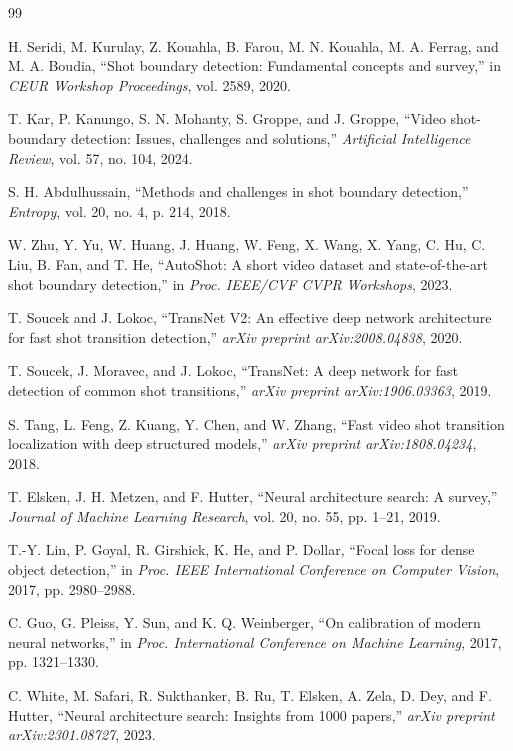 \documentclass[journal]{IEEEtran}
\begin{document}
\begin{thebibliography}{99}

H. Seridi, M. Kurulay, Z. Kouahla, B. Farou, M. N. Kouahla, M. A. Ferrag, and M. A. Boudia, ``Shot boundary detection: Fundamental concepts and survey,'' in \emph{CEUR Workshop Proceedings}, vol. 2589, 2020.

T. Kar, P. Kanungo, S. N. Mohanty, S. Groppe, and J. Groppe, ``Video shot-boundary detection: Issues, challenges and solutions,'' \emph{Artificial Intelligence Review}, vol. 57, no. 104, 2024.

S. H. Abdulhussain, ``Methods and challenges in shot boundary detection,'' \emph{Entropy}, vol. 20, no. 4, p. 214, 2018.

W. Zhu, Y. Yu, W. Huang, J. Huang, W. Feng, X. Wang, X. Yang, C. Hu, C. Liu, B. Fan, and T. He, ``AutoShot: A short video dataset and state-of-the-art shot boundary detection,'' in \emph{Proc. IEEE/CVF CVPR Workshops}, 2023.

T. Soucek and J. Lokoc, ``TransNet V2: An effective deep network architecture for fast shot transition detection,'' \emph{arXiv preprint arXiv:2008.04838}, 2020.

T. Soucek, J. Moravec, and J. Lokoc, ``TransNet: A deep network for fast detection of common shot transitions,'' \emph{arXiv preprint arXiv:1906.03363}, 2019.

S. Tang, L. Feng, Z. Kuang, Y. Chen, and W. Zhang, ``Fast video shot transition localization with deep structured models,'' \emph{arXiv preprint arXiv:1808.04234}, 2018.

T. Elsken, J. H. Metzen, and F. Hutter, ``Neural architecture search: A survey,'' \emph{Journal of Machine Learning Research}, vol. 20, no. 55, pp. 1--21, 2019.

T.-Y. Lin, P. Goyal, R. Girshick, K. He, and P. Dollar, ``Focal loss for dense object detection,'' in \emph{Proc. IEEE International Conference on Computer Vision}, 2017, pp. 2980--2988.

C. Guo, G. Pleiss, Y. Sun, and K. Q. Weinberger, ``On calibration of modern neural networks,'' in \emph{Proc. International Conference on Machine Learning}, 2017, pp. 1321--1330.

C. White, M. Safari, R. Sukthanker, B. Ru, T. Elsken, A. Zela, D. Dey, and F. Hutter, ``Neural architecture search: Insights from 1000 papers,'' \emph{arXiv preprint arXiv:2301.08727}, 2023.


\end{thebibliography}
\end{document}

